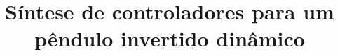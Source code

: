 \documentclass{tcc}
\title{Síntese de controladores para um pêndulo invertido dinâmico}
\begin{document}
    \maketitle{}
    
    \toc{}
    
    
    
    
    
\end{document}
